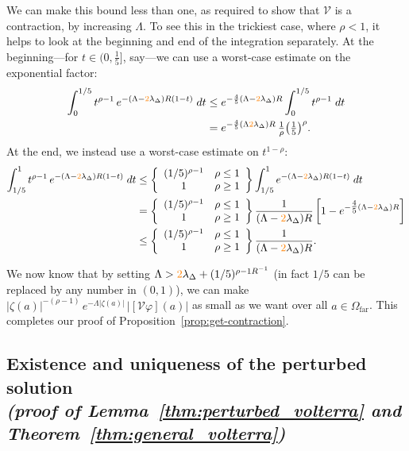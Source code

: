 \documentclass{article}
\theoremstyle{plain}
\newcommand{\volterra}{\mathcal{V}}
\newcommand{\far}{\Omega_\text{far}}
\begin{document}
We can make this bound less than one, as required to show that $\volterra$ is a contraction, by increasing $\Lambda$. To see this in the trickiest case, where $\rho < 1$, it helps to look at the beginning and end of the integration separately. At the beginning---for $t \in \big(0, \tfrac{1}{5}\big]$, say---we can use a worst-case estimate on the exponential factor:
\begin{align*}
\int_0^{1/5} t^{\rho-1}\,e^{-(\Lambda - \textcolor{orange}{2} \lambda_\Delta)R(1 - t)}\;dt & \le e^{-\frac{4}{5}(\Lambda -\textcolor{orange}{2} \lambda_\Delta)R} \int_0^{1/5} t^{\rho-1}\;dt \\
& = e^{-\frac{4}{5}(\Lambda \textcolor{orange}{2} \lambda_\Delta)R}\,\tfrac{1}{\rho} \big(\tfrac{1}{5}\big)^\rho.
\end{align*}
At the end, we instead use a worst-case estimate on $t^{1-\rho}$:
\begin{align*}
\int_{1/5}^1 t^{\rho-1}\,e^{-(\Lambda - \textcolor{orange}{2}\lambda_\Delta)R(1 - t)}\;dt & \le \left\{\begin{array}{cc}(1/5)^{\rho-1} & \rho \le 1 \\ 1 & \rho \ge 1 \end{array}\right\} \int_{1/5}^1 e^{-(\Lambda -\textcolor{orange}{2} \lambda_\Delta)R(1 - t)}\;dt \\
& = \left\{\begin{array}{cc}(1/5)^{\rho-1} & \rho \le 1 \\ 1 & \rho \ge 1 \end{array}\right\} \frac{1}{(\Lambda - \textcolor{orange}{2}\lambda_\Delta)R}\left[ 1 - e^{-\tfrac{4}{5}(\Lambda - \textcolor{orange}{2}\lambda_\Delta)R} \right] \\
& \le \left\{\begin{array}{cc}(1/5)^{\rho-1} & \rho \le 1 \\ 1 & \rho \ge 1 \end{array}\right\} \frac{1}{(\Lambda - \textcolor{orange}{2}\lambda_\Delta)R}.
\end{align*}

We now know that by setting $\Lambda > \textcolor{orange}{2}\lambda_\Delta+ (1/5)^{\rho-1 R^{-1}}$ (in fact $1/5$ can be replaced by any number in $(0,1)$), we can make $|\zeta(a)|^{-(\rho-1)}\,e^{-\Lambda|\zeta(a)|}\,|[\volterra\varphi](a)|$ as small as we want over all $a \in \far$. This completes our proof of Proposition~\ref{prop:get-contraction}.
\subsection{Existence and uniqueness of the perturbed solution \\ \textit{(proof of Lemma~\ref{thm:perturbed_volterra} and Theorem~\ref{thm:general_volterra})}}\label{sec:existence and uniqueness}
\end{document}
